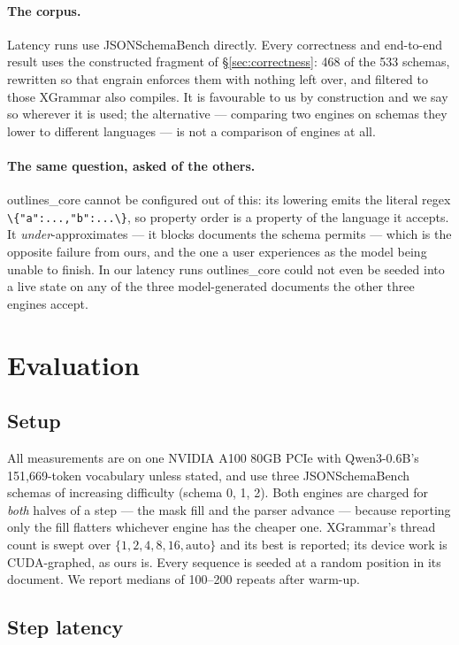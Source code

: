 \documentclass{article}
\begin{document}
\paragraph{The corpus.} Latency runs use JSONSchemaBench directly. Every
correctness and end-to-end result uses the constructed fragment of
\S\ref{sec:correctness}: 468 of the 533 schemas, rewritten so that engrain
enforces them with nothing left over, and filtered to those XGrammar also
compiles. It is favourable to us by construction and we say so wherever it is
used; the alternative --- comparing two engines on schemas they lower to
different languages --- is not a comparison of engines at all.

\paragraph{The same question, asked of the others.} outlines\_core cannot be
configured out of this: its lowering emits the literal regex
\verb|\{"a":...,"b":...\}|, so property order is a property of the language it
accepts. It \emph{under}-approximates --- it blocks documents the schema
permits --- which is the opposite failure from ours, and the one a user
experiences as the model being unable to finish. In our latency runs
outlines\_core could not even be seeded into a live state on any of the three
model-generated documents the other three engines accept.

\section{Evaluation}
\label{sec:eval}

\subsection{Setup}

All measurements are on one NVIDIA A100 80GB PCIe with Qwen3-0.6B's
151{,}669-token vocabulary unless stated, and use three JSONSchemaBench schemas
of increasing difficulty (schema 0, 1, 2). Both engines are charged for
\emph{both} halves of a step --- the mask fill and the parser advance --- because
reporting only the fill flatters whichever engine has the cheaper one.
XGrammar's thread count is swept over $\{1,2,4,8,16,\text{auto}\}$ and its best
is reported; its device work is CUDA-graphed, as ours is. Every sequence is
seeded at a random position in its document. We report medians of 100--200
repeats after warm-up.

\subsection{Step latency}
\label{sec:eval-step}
\end{document}
